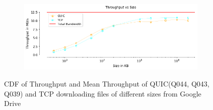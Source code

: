 \begin{frame}
\begin{figure}[!htb]
\begin{subfigure}{0.45\textwidth}
    \end{subfigure}   
    \begin{subfigure}{0.45\textwidth}
        \includegraphics[width=\linewidth]{./plots/PI/gdrive/MeanThroughputvssize.png}
    \end{subfigure}   
    \caption{CDF of Throughput and Mean Throughput of QUIC(Q044, Q043, Q039) and TCP downloading files of different sizes from Google Drive}\label{fig:cdf-of-mean}
\end{figure}
\end{frame}
\clearpage

